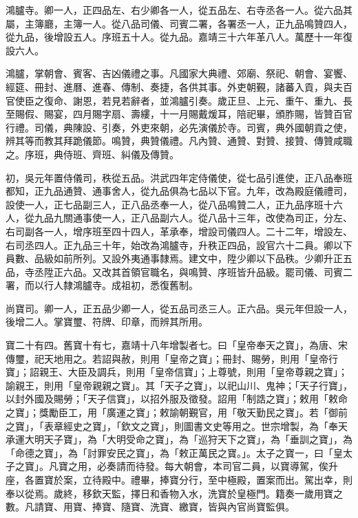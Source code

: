 鴻臚寺。卿一人，正四品左、右少卿各一人，從五品左、右寺丞各一人。從六品其屬，主簿廳，主簿一人。從八品司儀、司賓二署，各署丞一人，正九品鳴贊四人，從九品，後增設五人。序班五十人。從九品。嘉靖三十六年革八人。萬歷十一年復設六人。

鴻臚，掌朝會、賓客、吉凶儀禮之事。凡國家大典禮、郊廟、祭祀、朝會、宴饗、經筵、冊封、進曆、進春、傳制、奏捷，各供其事。外吏朝覲，諸蕃入貢，與夫百官使臣之復命、謝恩，若見若辭者，並鴻臚引奏。歲正旦、上元、重午、重九、長至賜假、賜宴，四月賜字扇、壽縷，十一月賜戴煖耳，陪祀畢，頒胙賜，皆贊百官行禮。司儀，典陳設、引奏，外吏來朝，必先演儀於寺。司賓，典外國朝貢之使，辨其等而教其拜跪儀節。鳴贊，典贊儀禮。凡內贊、通贊、對贊、接贊、傳贊咸職之。序班，典侍班、齊班、糾儀及傳贊。

初，吳元年置侍儀司，秩從五品。洪武四年定侍儀使，從七品引進使，正八品奉班都知，正九品通贊、通事舍人，從九品俱為七品以下官。九年，改為殿庭儀禮司，設使一人，正七品副三人，正八品丞奉一人，從八品鳴贊二人，正九品序班十六人，從九品九關通事使一人，正八品副六人。從八品十三年，改使為司正，分左、右司副各一人，增序班至四十四人，革承奉，增設司儀四人。二十二年，增設左、右司丞四人。正九品三十年，始改為鴻臚寺，升秩正四品，設官六十二員。卿以下員數、品級如前所列。又設外夷通事隸焉。建文中，陞少卿以下品秩。少卿升正五品，寺丞陞正六品。又改其首領官職名，與鳴贊、序班皆升品級。罷司儀、司賓二署，而以行人隸鴻臚寺。成祖初，悉復舊制。

尚寶司。卿一人，正五品少卿一人，從五品司丞三人。正六品。吳元年但設一人，後增二人。掌寶璽、符牌、印章，而辨其所用。

寶二十有四。舊寶十有七，嘉靖十八年增製者七。曰「皇帝奉天之寶」，為唐、宋傳璽，祀天地用之。若詔與赦，則用「皇帝之寶」；冊封、賜勞，則用「皇帝行寶」；詔親王、大臣及調兵，則用「皇帝信寶」；上尊號，則用「皇帝尊親之寶」；諭親王，則用「皇帝親親之寶」。其「天子之寶」，以祀山川、鬼神；「天子行寶」，以封外國及賜勞；「天子信寶」，以招外服及徵發。詔用「制誥之寶」；敕用「敕命之寶」；獎勵臣工，用「廣運之寶」；敕諭朝覲官，用「敬天勤民之寶」。若「御前之寶」，「表章經史之寶」，「欽文之寶」，則圖書文史等用之。世宗增製，為「奉天承運大明天子寶」，為「大明受命之寶」，為「巡狩天下之寶」，為「垂訓之寶」，為「命德之寶」，為「討罪安民之寶」，為「敕正萬民之寶。」。太子之寶一，曰「皇太子之寶」。凡寶之用，必奏請而待發。每大朝會，本司官二員，以寶導駕，俟升座，各置寶於案，立待殿中。禮畢，捧寶分行，至中極殿，置案而出。駕出幸，則奉以從焉。歲終，移欽天監，擇日和香物入水，洗寶於皇極門。籍奏一歲用寶之數。凡請寶、用寶、捧寶、隨寶、洗寶、繳寶，皆與內官尚寶監俱。

